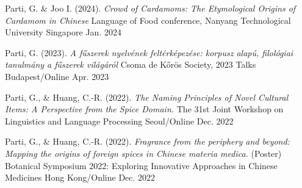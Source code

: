 
\begin{cventries}

  \cventry
  {Parti, G. \& Joo I. (2024). \textit{Crowd of Cardamoms: The Etymological Origins of Cardamom in Chinese}} %
  {Language of Food conference, Nanyang Technological University \href{https://www.ntu.edu.sg/soh/news-events/events/detail/2024/01/29/research-events/the-language-of-food-exploring-culinary-communication-and-culture}{\faExternalLink}} %
  {Singapore} %
  {Jan. 2024} %
  {
  }

  

  \cventry
  {Parti, G. (2023). \textit{A fűszerek nyelvének feltérképezése: korpusz alapú, filológiai tanulmány a fűszerek világáról}} %
  {Csoma de Kőrös Society, 2023 Talks  \href{https://www.youtube.com/watch?v=udy1Hrn0wc0}{\faExternalLink}} %
  {Budapest/Online} %
  {Apr. 2023} %
  {
  }

  \cventry
    {Parti, G., \& Huang, C.-R. (2022). \textit{The Naming Principles of Novel Cultural Items: A Perspective from the Spice Domain.}} %
    {The 31st Joint Workshop on Linguistics and Language Processing \href{https://jwllp31.github.io/program/}{\faExternalLink}} %
    {Seoul/Online} %
    {Dec. 2022} %
    {
    }


  \cventry
    {Parti, G., \& Huang, C.-R. (2022). \textit{Fragrance from the periphery and beyond: Mapping the origins of foreign spices in Chinese materia medica.} (Poster)} %
    {Botanical Symposium 2022: Exploring Innovative Approaches in Chinese Medicines \href{https://event.fourwaves.com/botanicalsymposium2022/abstracts/1ea06222-f8a6-400c-8c92-de4e419a56f3}{\faExternalLink}} %
    {Hong Kong/Online} %
    {Dec. 2022} %
    {
    }

\end{cventries}
